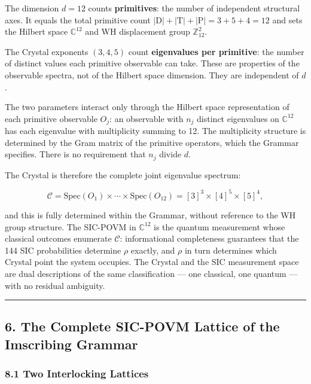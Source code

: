 The dimension \(d=12\) counts \textbf{primitives}: the number of
independent structural axes. It equals the total primitive count
\(|\mathrm{D}| + |\mathrm{T}| + |\mathrm{P}| = 3 + 5 + 4 = 12\) and sets
the Hilbert space \(\mathbb{C}^{12}\) and WH displacement group
\(\mathbb{Z}_{12}^2\).

The Crystal exponents \((3, 4, 5)\) count \textbf{eigenvalues per
primitive}: the number of distinct values each primitive observable can
take. These are properties of the observable spectra, not of the Hilbert
space dimension. They are independent of \(d\).

The two parameters interact only through the Hilbert space
representation of each primitive observable \(O_j\): an observable with
\(n_j\) distinct eigenvalues on \(\mathbb{C}^{12}\) has each eigenvalue
with multiplicity summing to 12. The multiplicity structure is
determined by the Gram matrix of the primitive operators, which the
Grammar specifies. There is no requirement that \(n_j\) divide \(d\).

The Crystal is therefore the complete joint eigenvalue spectrum:

\[\mathcal{C} = \mathrm{Spec}(O_1) \times \cdots \times \mathrm{Spec}(O_{12}) = [3]^3 \times [4]^5 \times [5]^4,\]

and this is fully determined within the Grammar, without reference to
the WH group structure. The SIC-POVM in \(\mathbb{C}^{12}\) is the
quantum measurement whose classical outcomes enumerate \(\mathcal{C}\):
informational completeness guarantees that the 144 SIC probabilities
determine \(\rho\) exactly, and \(\rho\) in turn determines which
Crystal point the system occupies. The Crystal and the SIC measurement
space are dual descriptions of the same classification --- one
classical, one quantum --- with no residual ambiguity.

\begin{center}\rule{0.5\linewidth}{0.5pt}\end{center}

\hypertarget{the-complete-sic-povm-lattice-of-the-imscribing-grammar}{%
\subsection{6. The Complete SIC-POVM Lattice of the Imscribing
Grammar}\label{the-complete-sic-povm-lattice-of-the-imscribing-grammar}}

\hypertarget{two-interlocking-lattices}{%
\subsubsection{8.1 Two Interlocking
Lattices}\label{two-interlocking-lattices}}

